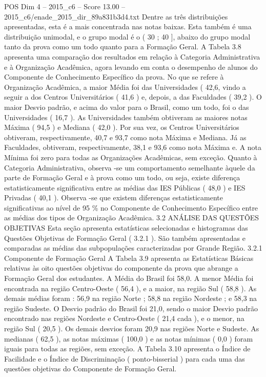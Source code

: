 \begin{textsample}{POS Dim 4 – 2015\_c6 – Score 13.00 – 2015\_c6/enade\_2015\_dir\_89a831b3d4.txt}
Dentre as três distribuições apresentadas, esta é a mais concentrada nas notas baixas.
Esta também é uma distribuição unimodal, e o grupo modal é o ( 30 ; 40 ], abaixo do grupo modal tanto da prova como um todo quanto para a Formação Geral.
A Tabela 3.8 apresenta uma comparação dos resultados em relação à Categoria Administrativa e à Organização Acadêmica, agora levando em conta o desempenho de alunos do Componente de Conhecimento Específico da prova.
No que se refere à Organização Acadêmica, a maior Média foi das Universidades ( 42,6, vindo a seguir a dos Centros Universitários ( 41,6 ) e, depois, a das Faculdades ( 39,2 ).
O maior Desvio padrão, e acima do valor para o Brasil, como um todo, foi o das Universidades ( 16,7 ).
As Universidades também obtiveram as maiores notas Máxima ( 94,5 ) e Mediana ( 42,0 ).
Por sua vez, os Centros Universitários obtiveram, respectivamente, 40,7 e 93,7 como nota Máxima e Mediana.
Já as Faculdades, obtiveram, respectivamente, 38,1 e 93,6 como nota Máxima e.
A nota Mínima foi zero para todas as Organizações Acadêmicas, sem exceção.
Quanto à Categoria Administrativa, observa -se um comportamento semelhante àquele da parte de Formação Geral e à prova como um todo, ou seja, existe diferença estatisticamente significativa entre as médias das IES Públicas ( 48,0 ) e IES Privadas ( 40,1 ).
Observa -se que existem diferenças estatisticamente significativas ao nível de 95 \% no Componente de Conhecimento Específico entre as médias dos tipos de Organização Acadêmica. 3.2 ANÁLISE DAS QUESTÕES OBJETIVAS Esta seção apresenta estatísticas selecionadas e histogramas das Questões Objetivas de Formação Geral ( 3.2.1 ).
São também apresentadas e comparadas as médias das subpopulações caracterizadas por Grande Região. 3.2.1 Componente de Formação Geral A Tabela 3.9 apresenta as Estatísticas Básicas relativas às oito questões objetivas do componente da prova que abrange a Formação Geral dos estudantes.
A Média do Brasil foi 58,0.
A menor Média foi encontrada na região Centro-Oeste ( 56,4 ), e a maior, na região Sul ( 58,8 ).
As demais médias foram : 56,9 na região Norte ; 58,8 na região Nordeste ; e 58,3 na região Sudeste.
O Desvio padrão do Brasil foi 21,0, sendo o maior Desvio padrão encontrado nas regiões Nordeste e Centro-Oeste ( 21,4 cada ), e o menor, na região Sul ( 20,5 ).
Os demais desvios foram 20,9 nas regiões Norte e Sudeste.
As medianas ( 62,5 ), as notas máximas ( 100,0 ) e as notas mínimas ( 0,0 ) foram iguais para todas as regiões, sem exceção.
A Tabela 3.10 apresenta o Índice de Facilidade e o Índice de Discriminação ( ponto-bisserial ) para cada uma das questões objetivas do Componente de Formação Geral.

\end{textsample}
